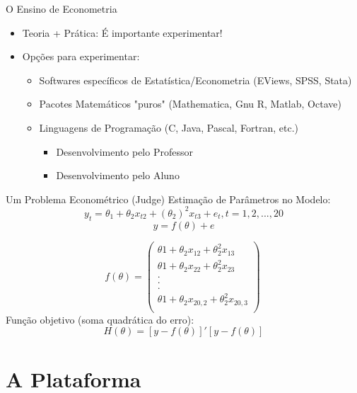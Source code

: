 \documentclass{beamer}
\begin{document}
\begin{frame}{O Ensino de Econometria}
	\begin{itemize}
		\item Teoria + Prática: É importante experimentar!
		\item Opções para experimentar:
		\begin {itemize}
			\item Softwares específicos de Estatística/Econometria (EViews, SPSS, Stata)
			\item Pacotes Matemáticos "puros" (Mathematica, Gnu R, Matlab, Octave)
			\item Linguagens de Programação (C, Java, Pascal, Fortran, etc.)
			\begin {itemize}
				\item Desenvolvimento pelo Professor
				\item Desenvolvimento pelo Aluno
			\end {itemize}
		\end {itemize}
	\end{itemize}
\end{frame}

\begin{frame}{Um Problema Econométrico}
(Judge) Estimação de Parâmetros no Modelo:
\[ y_t = \theta_1 + \theta_2 x_{t2} + (\theta_2)^2 x_{t3} +e_t , t = 1,2,...,20 \]
\[ y = f(\theta)+e\]

\[ f(\theta)=
        \left( \begin{array}{ccc}
\theta1 + \theta_2 x_{12} + \theta_2^2 x_{13} \\
\theta1 + \theta_2 x_{22} + \theta_2^2 x_{23} \\
.\\
.\\
.\\
\theta1 + \theta_2 x_{20,2} + \theta_2^2 x_{20,3} \\

\end{array} \right)\
 \]
Função objetivo (soma quadrática do erro): 
 \begin{equation}
  \label{eq_H}
  H(\theta) = [y - f(\theta)]'[y - f(\theta)] 
\end{equation}

\end{frame}

\section{A Plataforma}
\end{document}
